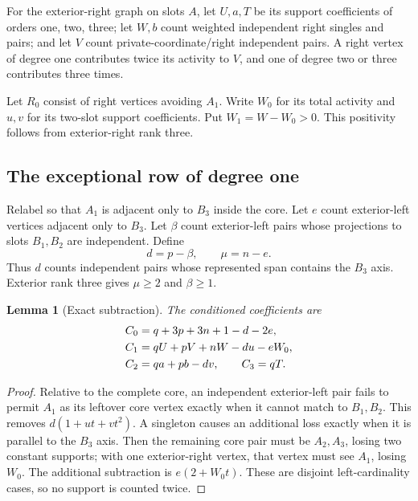 \documentclass[11pt,a4paper]{article}
\newtheorem{lemma}[theorem]{Lemma}
\theoremstyle{remark}\newtheorem{remark}[theorem]{Remark}
\begin{document}
For the exterior-right graph on slots $A$, let $U,a,T$ be its support coefficients of orders one, two, three; let $W,b$ count weighted independent right singles and pairs; and let $V$ count private-coordinate/right independent pairs. A right vertex of degree one contributes twice its activity to $V$, and one of degree two or three contributes three times.

Let $R_0$ consist of right vertices avoiding $A_1$. Write $W_0$ for its total activity and $u,v$ for its two-slot support coefficients. Put $W_1=W-W_0>0$. This positivity follows from exterior-right rank three.

\subsection{The exceptional row of degree one}
Relabel so that $A_1$ is adjacent only to $B_3$ inside the core. Let $e$ count exterior-left vertices adjacent only to $B_3$. Let $\beta$ count exterior-left pairs whose projections to slots $B_1,B_2$ are independent. Define
\[
 d=p-\beta,\qquad \mu=n-e.
\]
Thus $d$ counts independent pairs whose represented span contains the $B_3$ axis. Exterior rank three gives $\mu\ge2$ and $\beta\ge1$.

\begin{lemma}[Exact subtraction]\label{mrn:e:tr:lem:counts}
The conditioned coefficients are
\begin{align}
 C_0&=q+3p+3n+1-d-2e,\notag\\
 C_1&=qU+pV+nW-du-eW_0,\label{mrn:e:tr:eq:coeff}\\
 C_2&=qa+pb-dv,\qquad C_3=qT.\notag
\end{align}
\end{lemma}
\begin{proof}
Relative to the complete core, an independent exterior-left pair fails to permit $A_1$ as its leftover core vertex exactly when it cannot match to $B_1,B_2$. This removes $d(1+ut+vt^2)$. A singleton causes an additional loss exactly when it is parallel to the $B_3$ axis. Then the remaining core pair must be $A_2,A_3$, losing two constant supports; with one exterior-right vertex, that vertex must see $A_1$, losing $W_0$. The additional subtraction is $e(2+W_0t)$. These are disjoint left-cardinality cases, so no support is counted twice.
\end{proof}
\end{document}
